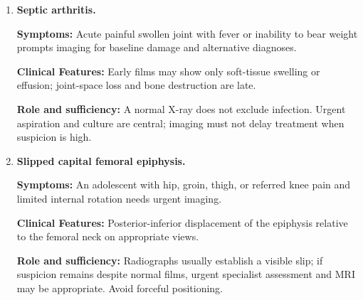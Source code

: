 \begin{enumerate}[leftmargin=*,itemsep=0.45em,topsep=0.4em]
\item \textbf{Septic arthritis.}\par\noindent\textbf{Symptoms:} Acute painful swollen joint with fever or inability to bear weight prompts imaging for baseline damage and alternative diagnoses.\par\noindent\textbf{Clinical Features:} Early films may show only soft-tissue swelling or effusion; joint-space loss and bone destruction are late.\par\noindent\textbf{Role and sufficiency:} A normal X-ray does not exclude infection. Urgent aspiration and culture are central; imaging must not delay treatment when suspicion is high.
\item \textbf{Slipped capital femoral epiphysis.}\par\noindent\textbf{Symptoms:} An adolescent with hip, groin, thigh, or referred knee pain and limited internal rotation needs urgent imaging.\par\noindent\textbf{Clinical Features:} Posterior-inferior displacement of the epiphysis relative to the femoral neck on appropriate views.\par\noindent\textbf{Role and sufficiency:} Radiographs usually establish a visible slip; if suspicion remains despite normal films, urgent specialist assessment and MRI may be appropriate. Avoid forceful positioning.
\end{enumerate}

